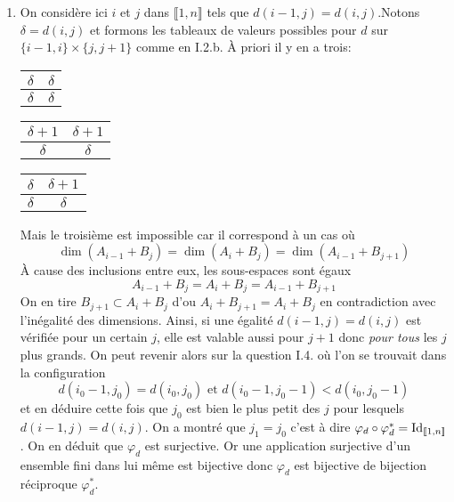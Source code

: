 \begin{enumerate}
\begin{enumerate}
  \item On considère ici $i$ et $j$ dans $\llbracket 1,n \rrbracket$ tels que $d(i-1,j)=d(i,j)$.\newline Notons $\delta = d(i,j)$ et formons les tableaux de valeurs possibles pour $d$ sur $\{i-1,i\}\times \{j,j+1\}$ comme en I.2.b. \`A priori il y en a trois: 
\begin{center}
\renewcommand {\arraystretch} {1.2}
\hspace{1cm}
\begin{tabular}{|c|c|} \hline
  $\delta$ & $\delta$ \\ \hline
  $\delta $ & $\delta $ \\ \hline  
\end{tabular}\hfill 
\begin{tabular}{|c|c|} \hline
  $\delta + 1$ & $\delta + 1$ \\ \hline
  $\delta $ & $\delta $ \\ \hline  
\end{tabular}\hfill 
\begin{tabular}{|c|c|} \hline
  $\delta$ & $\delta + 1$ \\ \hline
  $\delta $ & $\delta $ \\ \hline  
\end{tabular}
\hspace{1cm}\phantom{.}
\end{center}
Mais le troisième est impossible car il correspond à un cas où
\begin{displaymath}
  \dim(A_{i-1} + B_j) = \dim(A_{i} + B_j) = \dim(A_{i-1} + B_{j+1}) 
\end{displaymath}
\`A cause des inclusions entre eux, les sous-espaces sont égaux
\begin{displaymath}
A_{i-1} + B_j = A_{i} + B_j = A_{i-1} + B_{j+1}  
\end{displaymath}
On en tire $B_{j+1} \subset A_{i} + B_j$ d'ou $A_i + B_{j+1} = A_i + B_{j}$ en contradiction avec l'inégalité des dimensions.\newline
Ainsi, si une égalité $d(i-1,j)=d(i,j)$ est vérifiée pour un certain $j$, elle est valable aussi pour $j+1$ donc \emph{pour tous} les $j$ plus grands.\newline
On peut revenir alors sur la question I.4. où l'on se trouvait dans la configuration 
\begin{displaymath}
  d(i_0-1,j_0) = d(i_0,j_0) \text{ et } d(i_0-1,j_0 -1) < d(i_0,j_0 -1)
\end{displaymath}
et en déduire cette fois que $j_0$ est bien le plus petit des $j$ pour lesquels $d(i-1,j) = d(i,j)$.\newline
On a montré que $j_1=j_0$ c'est à dire $\varphi_d \circ \varphi^*_d = \operatorname{Id}_{\llbracket 1,n \rrbracket}$. On en déduit que $\varphi_d$ est surjective. Or une application surjective d'un ensemble fini dans lui même est bijective donc $\varphi_d$ est bijective de bijection réciproque $\varphi^*_d$.


\end{enumerate}
\end{enumerate}
